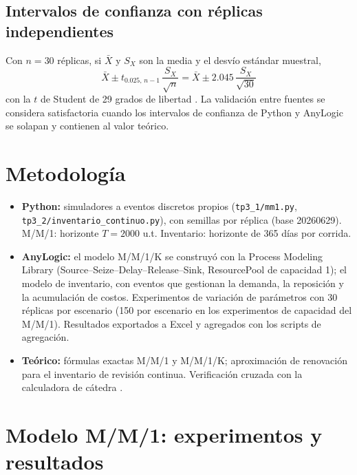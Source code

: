 \documentclass[11pt,a4paper]{article}
\begin{document}
\subsection{Intervalos de confianza con réplicas independientes}

Con $n=30$ réplicas, si $\bar{X}$ y $S_X$ son la media y el desvío estándar
muestral,
\begin{equation}
    \bar{X} \pm t_{0.025,\,n-1}\,\frac{S_X}{\sqrt{n}}
    = \bar{X} \pm 2.045\,\frac{S_X}{\sqrt{30}}
\end{equation}
con la $t$ de Student de 29 grados de libertad \cite{lawkelton}. La
validación entre fuentes se considera satisfactoria cuando los intervalos
de confianza de Python y AnyLogic se solapan y contienen al valor teórico.

\section{Metodología}

\begin{itemize}
    \item \textbf{Python:} simuladores a eventos discretos propios
          (\texttt{tp3\_1/mm1.py}, \texttt{tp3\_2/inventario\_continuo.py}),
          con semillas por réplica (base 20260629). M/M/1: horizonte
          $T=2000$ u.t. Inventario: horizonte de 365 días por corrida.
    \item \textbf{AnyLogic:} el modelo M/M/1/K se construyó con la Process
          Modeling Library (Source--Seize--Delay--Release--Sink, ResourcePool
          de capacidad 1); el modelo de inventario, con eventos que gestionan
          la demanda, la reposición y la acumulación de costos. Experimentos
          de variación de parámetros con 30 réplicas por escenario (150 por
          escenario en los experimentos de capacidad del M/M/1). Resultados
          exportados a Excel y agregados con los scripts de agregación.
    \item \textbf{Teórico:} fórmulas exactas M/M/1 y M/M/1/K; aproximación de
          renovación para el inventario de revisión continua. Verificación
          cruzada con la calculadora de cátedra \cite{calculadora}.
\end{itemize}

\section{Modelo M/M/1: experimentos y resultados}
\end{document}
